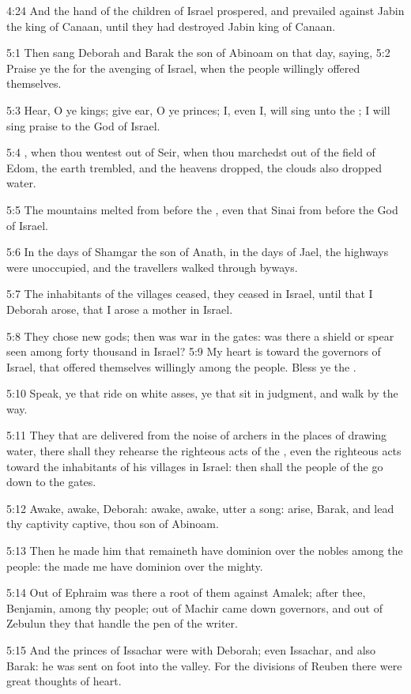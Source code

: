 4:24 And the hand of the children of Israel prospered, and prevailed
against Jabin the king of Canaan, until they had destroyed Jabin king
of Canaan.

5:1 Then sang Deborah and Barak the son of Abinoam on that day,
saying, 5:2 Praise ye the \LORD for the avenging of Israel, when the
people willingly offered themselves.

5:3 Hear, O ye kings; give ear, O ye princes; I, even I, will sing
unto the \LORD; I will sing praise to the \LORD God of Israel.

5:4 \LORD, when thou wentest out of Seir, when thou marchedst out of
the field of Edom, the earth trembled, and the heavens dropped, the
clouds also dropped water.

5:5 The mountains melted from before the \LORD, even that Sinai from
before the \LORD God of Israel.

5:6 In the days of Shamgar the son of Anath, in the days of Jael, the
highways were unoccupied, and the travellers walked through byways.

5:7 The inhabitants of the villages ceased, they ceased in Israel,
until that I Deborah arose, that I arose a mother in Israel.

5:8 They chose new gods; then was war in the gates: was there a shield
or spear seen among forty thousand in Israel?  5:9 My heart is toward
the governors of Israel, that offered themselves willingly among the
people. Bless ye the \LORD.

5:10 Speak, ye that ride on white asses, ye that sit in judgment, and
walk by the way.

5:11 They that are delivered from the noise of archers in the places
of drawing water, there shall they rehearse the righteous acts of the
\LORD, even the righteous acts toward the inhabitants of his villages
in Israel: then shall the people of the \LORD go down to the gates.

5:12 Awake, awake, Deborah: awake, awake, utter a song: arise, Barak,
and lead thy captivity captive, thou son of Abinoam.

5:13 Then he made him that remaineth have dominion over the nobles
among the people: the \LORD made me have dominion over the mighty.

5:14 Out of Ephraim was there a root of them against Amalek; after
thee, Benjamin, among thy people; out of Machir came down governors,
and out of Zebulun they that handle the pen of the writer.

5:15 And the princes of Issachar were with Deborah; even Issachar, and
also Barak: he was sent on foot into the valley. For the divisions of
Reuben there were great thoughts of heart.

